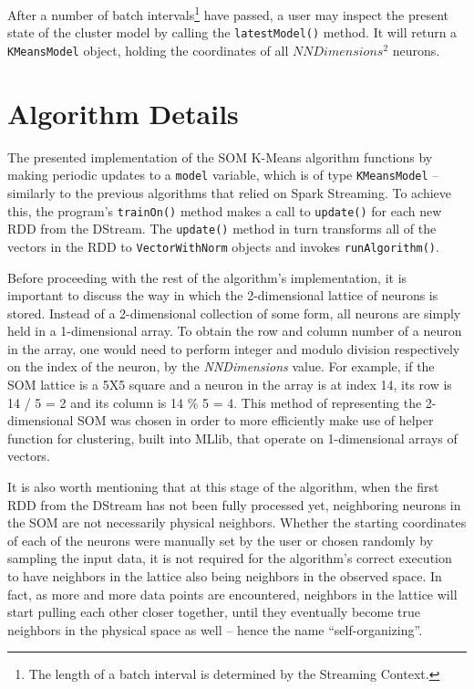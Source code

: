 \documentclass{l4proj}
\begin{document}
After a number of batch intervals\footnote{The length of a batch interval is determined by the Streaming Context.} have passed, a user may inspect the present state of the cluster model by calling the \texttt{latestModel()} method. It will return a \texttt{KMeansModel} object, holding the coordinates of all $NNDimensions^2$ neurons.

\section{Algorithm Details}

The presented implementation of the SOM K-Means algorithm functions by making periodic updates to a \texttt{model} variable, which is of type \texttt{KMeansModel} -- similarly to the previous algorithms that relied on Spark Streaming. To achieve this, the program's \texttt{trainOn()} method makes a call to \texttt{update()} for each new RDD from the DStream. The \texttt{update()} method in turn transforms all of the vectors in the RDD to \texttt{VectorWithNorm} objects and invokes \texttt{runAlgorithm()}.

Before proceeding with the rest of the algorithm's implementation, it is important to discuss the way in which the 2-dimensional lattice of neurons is stored. Instead of a 2-dimensional collection of some form, all neurons are simply held in a 1-dimensional array. To obtain the row and column number of a neuron in the array, one would need to perform integer and modulo division respectively on the index of the neuron, by the \textit{NNDimensions} value. For example, if the SOM lattice is a 5X5 square and a neuron in the array is at index 14, its row is 14 / 5 = 2  and its column is 14 \% 5 = 4. This method of representing the 2-dimensional SOM was chosen in order to more efficiently make use of helper function for clustering, built into MLlib, that operate on 1-dimensional arrays of vectors.

It is also worth mentioning that at this stage of the algorithm, when the first RDD from the DStream has not been fully processed yet, neighboring neurons in the SOM are not necessarily physical neighbors. Whether the starting coordinates of each of the neurons were manually set by the user or chosen randomly by sampling the input data, it is not required for the algorithm's correct execution to have neighbors in the lattice also being neighbors in the observed space. In fact, as more and more data points are encountered, neighbors in the lattice will start pulling each other closer together, until they eventually become true neighbors in the physical space as well -- hence the name ``self-organizing''.
\end{document}
